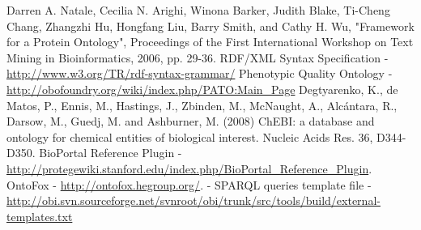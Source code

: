 \documentclass{ao2e}%
\begin{document}
\begin{thebibliography}{}
 Darren A. Natale, Cecilia N. Arighi, Winona Barker, Judith Blake, Ti-Cheng Chang, Zhangzhi Hu, Hongfang Liu, Barry Smith, and Cathy H. Wu, "Framework for a Protein Ontology", Proceedings of the First International Workshop on Text Mining in Bioinformatics, 2006, pp. 29-36.
 RDF/XML Syntax Specification - \url{http://www.w3.org/TR/rdf-syntax-grammar/}
 Phenotypic Quality Ontology - \url{http://obofoundry.org/wiki/index.php/PATO:Main_Page}
 Degtyarenko, K., de Matos, P., Ennis, M., Hastings, J., Zbinden, M., McNaught, A., Alcántara, R., Darsow, M., Guedj, M. and Ashburner, M. (2008) ChEBI: a database and ontology for chemical entities of biological interest. Nucleic Acids Res. 36, D344-D350.
 BioPortal Reference Plugin - \url{http://protegewiki.stanford.edu/index.php/BioPortal_Reference_Plugin}.
 OntoFox - \url{http://ontofox.hegroup.org/}.
 - SPARQL queries template file - \url{http://obi.svn.sourceforge.net/svnroot/obi/trunk/src/tools/build/external-templates.txt}

 
\end{thebibliography}
    
\begin{acronym}





\end{acronym}
\end{document}
